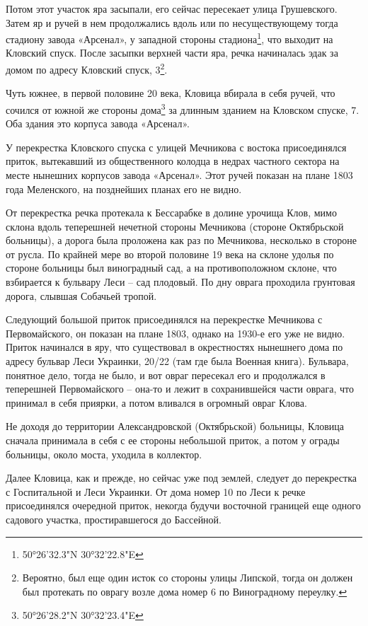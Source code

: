 Потом этот участок яра засыпали, его сейчас пересекает улица Грушевского. Затем яр и ручей в нем продолжались вдоль или по несуществующему тогда стадиону завода «Арсенал», у западной стороны стадиона\footnote{50°26'32.3"N 30°32'22.8"E}, что выходит на Кловский спуск. После засыпки верхней части яра, речка начиналась эдак за домом по адресу Кловский спуск, 3\footnote{Вероятно, был еще один исток со стороны улицы Липской, тогда он должен был протекать по оврагу возле дома номер 6 по Виноградному переулку.}. 

Чуть южнее, в первой половине 20 века, Кловица вбирала в себя ручей, что сочился от южной же стороны дома\footnote{50°26'28.2"N 30°32'23.4"E} за длинным зданием на Кловском спуске, 7. Оба здания это корпуса завода «Арсенал».

У перекрестка Кловского спуска с улицей Мечникова с востока присоединялся приток, вытекавший из общественного колодца в недрах частного сектора на месте нынешних корпусов завода «Арсенал». Этот ручей показан на плане 1803 года Меленского, на позднейших планах его не видно.

От перекрестка речка протекала к Бессарабке в долине урочища Клов, мимо склона вдоль теперешней нечетной стороны Мечникова (стороне Октябрьской больницы), а дорога была проложена как раз по Мечникова, несколько в стороне от русла. По крайней мере во второй половине 19 века на склоне удолья по стороне больницы был виноградный сад, а на противоположном склоне, что взбирается к бульвару Леси – сад плодовый. По дну оврага проходила грунтовая дорога, слывшая Собачьей тропой.

Следующий большой приток присоединялся на перекрестке Мечникова с Первомайского, он показан на плане 1803, однако на 1930-е его уже не видно. Приток начинался в яру, что существовал в окрестностях нынешнего дома по адресу бульвар Леси Украинки, 20/22 (там где была Военная книга). Бульвара, понятное дело, тогда не было, и вот овраг пересекал его и продолжался в теперешней Первомайского – она-то и лежит в сохранившейся части оврага, что принимал в себя приярки, а потом вливался в огромный овраг Клова.

Не доходя до территории Александровской (Октябрьской) больницы, Кловица сначала принимала в себя с ее стороны небольшой приток, а потом у ограды больницы, около моста, уходила в коллектор.

Далее Кловица, как и прежде, но сейчас уже под землей, следует до перекрестка с Госпитальной и Леси Украинки. От дома номер 10 по Леси к речке присоединялся очередной приток, некогда будучи восточной границей еще одного садового участка, простиравшегося до Бассейной.

